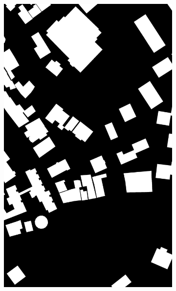 \begin{figure}[htb]
\begin{subfigure}{0.19\textwidth}
  \includegraphics[width=1\linewidth]{fig/vai/26_osm.jpg}
\end{subfigure}
\begin{subfigure}{0.19\textwidth}
  \centering

\end{subfigure}
\end{figure}
